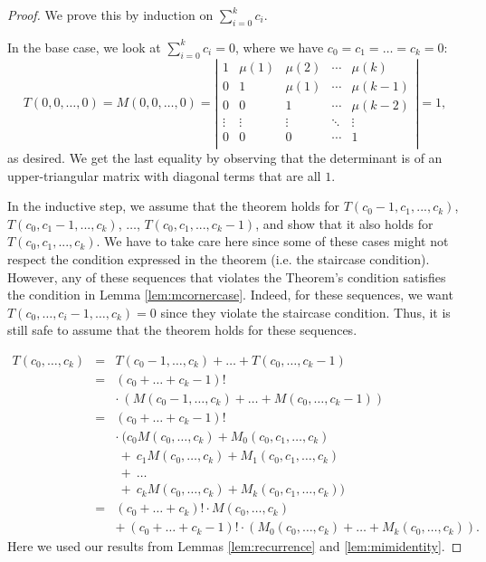 \documentclass[12pt]{amsart}
\newcommand{\ifact}{\mu}
\newcommand{\M}{M}
\begin{document}
\begin{proof}
We prove this by induction on $\sum_{i=0}^{k}{c_i}$.

In the base case, we look at $\sum_{i=0}^{k}{c_i} = 0$, where we have $c_0 = c_1 = \dots = c_k = 0$:
$$
T(0,0,\dots,0) = \M(0,0,\dots,0)=\left|
\begin{matrix}
1 & \ifact(1) & \ifact(2) & \cdots & \ifact(k) \\
0 & 1 & \ifact(1) & \cdots & \ifact(k-1) \\
0 & 0 & 1 & \cdots & \ifact(k-2) \\
\vdots & \vdots & \vdots & \ddots & \vdots \\
0 & 0 & 0 & \cdots & 1 \\
\end{matrix} \right| = 1,
$$
as desired. We get the last equality by observing that the determinant is of an upper-triangular matrix with diagonal terms that are all $1$.

In the inductive step, we assume that the theorem holds for $T(c_0-1,c_1,...,c_k)$, $T(c_0,c_1-1,...,c_k)$, $\dots$, $T(c_0,c_1,...,c_k-1)$, and show that it also holds for $T(c_0,c_1,...,c_k)$. We have to take care here since some of these cases might not respect the condition expressed in the theorem (i.e. the staircase condition). However, any of these sequences that violates the Theorem's condition satisfies the condition in Lemma \ref{lem:mcornercase}. Indeed, for these sequences, we want $T(c_0, \dots, c_i - 1, \dots, c_k) = 0$ since they violate the staircase condition. Thus, it is still safe to assume that the theorem holds for these sequences.

$$\begin{array}{ccl}
T(c_0, \dots, c_k) & = & T(c_0-1, \dots, c_k) + \dots + T(c_0, \dots, c_k-1) \\
& = & (c_0 + \dots + c_k-1)! \\
& & \cdot\ ( \M(c_0-1, \dots, c_k) + \dots + \M(c_0, \dots, c_k-1)) \\
& = & (c_0 + \dots + c_k-1)! \\
& & \cdot\ ( c_0 \M(c_0, \dots, c_k) + \M_0(c_0, c_1, \dots, c_k) \\
& & \ +\ c_1 \M(c_0, \dots, c_k) + \M_1(c_0, c_1, \dots, c_k) \\
& & \ +\ \dots \\
& & \ +\ c_k \M(c_0, \dots, c_k) + \M_k(c_0, c_1, \dots, c_k) ) \\
& = & (c_0 + \dots + c_k)! \cdot \M(c_0,\dots,c_k) \\
& & +\ (c_0+\dots+c_k-1)! \cdot (\M_0(c_0,\dots,c_k) + \dots + \M_k(c_0,\dots,c_k)).
\end{array}$$
Here we used our results from Lemmas \ref{lem:recurrence} and \ref{lem:mimidentity}.


\end{proof}
\end{document}
